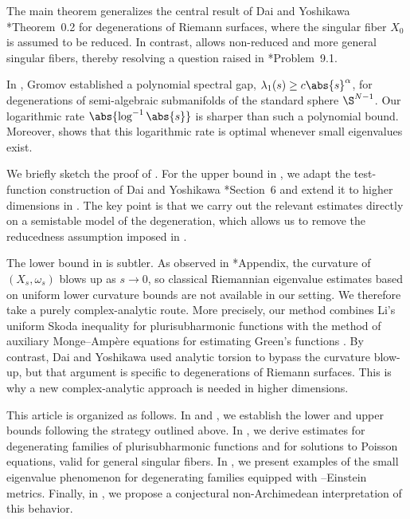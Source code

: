 \documentclass[12pt]{amsart}
\begin{document}
\begin{remark}
    The main theorem generalizes the central result of Dai and Yoshikawa
    \cite{Dai-Yoshikawa2025}*{Theorem~0.2} for degenerations of Riemann
    surfaces, where the singular fiber \(X_0\) is assumed to be reduced. In
    contrast,  allows non-reduced and more general
    singular fibers, thereby resolving a question raised in
    \cite{Dai-Yoshikawa2025}*{Problem~9.1}.
\end{remark}

\begin{remark}
    In \cite{Gromov1992}, Gromov established a polynomial spectral gap,
    \(\lambda_1(s) \geq c \abs{s}^{\alpha}\), for degenerations of
    semi-algebraic submanifolds of the standard sphere \(\S^{N-1}\). Our
    logarithmic rate \(\abs{\log^{-1} \abs{s}}\) is sharper than such a
    polynomial bound. Moreover,  shows that this
    logarithmic rate is optimal whenever small eigenvalues exist.
\end{remark}

We briefly sketch the proof of . For the upper
bound in , we adapt the test-function
construction of Dai and Yoshikawa \cite{Dai-Yoshikawa2025}*{Section~6} and
extend it to higher dimensions in . The key
point is that we carry out the relevant estimates directly on a semistable
model of the degeneration, which allows us to remove the reducedness
assumption imposed in \cite{Dai-Yoshikawa2025}.

The lower bound in  is subtler. As observed in
\cite{Dai-Yoshikawa2025}*{Appendix}, the curvature of \((X_s,\omega_s)\)
blows up as \(s \to 0\), so classical Riemannian eigenvalue estimates based on
uniform lower curvature bounds are not available in our setting. We therefore
take a purely complex-analytic route. More precisely, our method combines
Li's uniform Skoda inequality for plurisubharmonic functions \cite{Li2024}
with the method of auxiliary Monge--Amp\`ere equations for estimating Green's
functions \cites{Guo-Phong-Sturm2024, Guedj-To2025}. By contrast, Dai and
Yoshikawa used analytic torsion \cite{Bismut-Bost1990} to bypass the
curvature blow-up, but that argument is specific to degenerations of Riemann
surfaces. This is why a new complex-analytic approach is needed in higher
dimensions.

This article is organized as follows. In  and
, we establish the lower and upper bounds
following the strategy outlined above. In
, we derive estimates for degenerating
families of plurisubharmonic functions and for solutions to Poisson equations,
valid for general singular fibers. In
, we present examples of the
{small eigenvalue} phenomenon for degenerating families equipped with
\Kahler--Einstein metrics. Finally, in , we propose a
conjectural non-Archimedean interpretation of this behavior.
\end{document}
